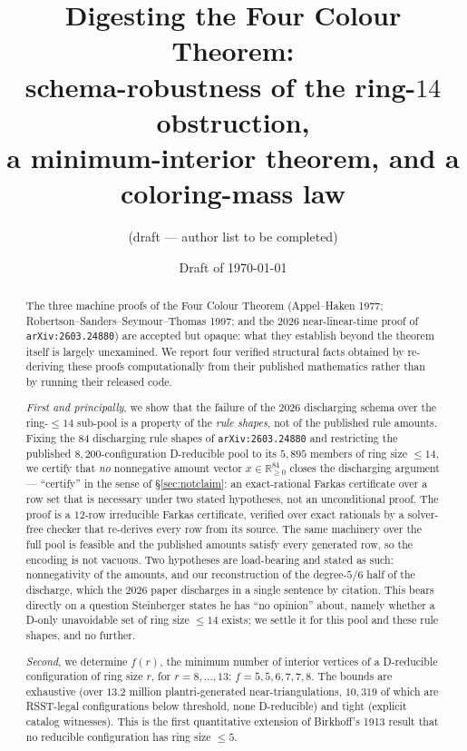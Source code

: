 \documentclass[11pt]{article}
\title{Digesting the Four Colour Theorem:\\
schema-robustness of the ring-$14$ obstruction,\\
a minimum-interior theorem, and a coloring-mass law}
\author{%
  (draft --- author list to be completed)%
}
\date{Draft of \today}
\theoremstyle{definition}
\begin{document}
\sloppy
\maketitle

\begin{abstract}
The three machine proofs of the Four Colour Theorem (Appel--Haken 1977;
Robertson--Sanders--Seymour--Thomas 1997; and the 2026 near-linear-time proof of
\texttt{arXiv:2603.24880}) are accepted but opaque: what they establish beyond the
theorem itself is largely unexamined. We report four verified structural facts
obtained by re-deriving these proofs computationally from their published
mathematics rather than by running their released code.

\emph{First and principally}, we show that the failure of the $2026$ discharging
schema over the ring-$\le 14$ sub-pool is a property of the \emph{rule shapes}, not
of the published rule amounts. Fixing the $84$ discharging rule shapes of
\texttt{arXiv:2603.24880} and restricting the published $8{,}200$-configuration
D-reducible pool to its $5{,}895$ members of ring size $\le 14$, we certify that
\emph{no} nonnegative amount vector $x\in\mathbb{R}^{84}_{\ge 0}$ closes the
discharging argument --- ``certify'' in the sense of \S\ref{sec:notclaim}: an
exact-rational Farkas certificate over a row set that is necessary under two
stated hypotheses, not an unconditional proof. The proof is a $12$-row irreducible Farkas certificate,
verified over exact rationals by a solver-free checker that re-derives every row
from its source. The same machinery over the full pool is feasible and the
published amounts satisfy every generated row, so the encoding is not vacuous.
Two hypotheses are load-bearing and stated as such: nonnegativity of the amounts,
and our reconstruction of the degree-$5$/$6$ half of the discharge, which the 2026
paper discharges in a single sentence by citation. This bears directly on a question
Steinberger \cite{steinberger2010} states he has ``no opinion'' about, namely whether
a D-only unavoidable set of ring size $\le 14$ exists; we settle it for this pool and
these rule shapes, and no further.

\emph{Second}, we determine $f(r)$, the minimum number of interior vertices of a
D-reducible configuration of ring size $r$, for $r=8,\dots,13$: $f = 5,5,6,7,7,8$.
The bounds are exhaustive (over $13.2$ million plantri-generated near-triangulations,
$10{,}319$ of which are RSST-legal configurations below threshold, none D-reducible)
and tight (explicit catalog witnesses). This is the first quantitative extension of
Birkhoff's 1913 result that no reducible configuration has ring size $\le 5$.


\end{abstract}
\end{document}
